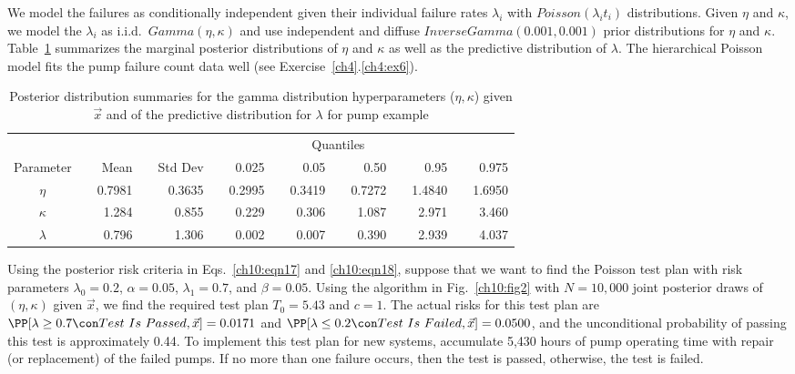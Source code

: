 \documentclass {book}
\begin{document}
\begin{sidebar}
We model the failures as conditionally independent given their
individual failure rates $\lambda_{i}$ with $Poisson(\lambda_i
t_i)$ distributions. Given $\eta$ and $\kappa$, we model the
$\lambda_i$ as i.i.d.\ $Gamma(\eta, \kappa)$ and use independent
and diffuse $InverseGamma(0.001,0.001)$ prior distributions for
$\eta$ and $\kappa$. Table~\ref{ch10:tab4} summarizes the marginal
posterior distributions of $\eta$ and $\kappa$ as well as the
predictive distribution of $\lambda$. The hierarchical Poisson
model fits the pump failure count data well (see
Exercise~\ref{ch4}.\ref{ch4:ex6}).

\begin{table}
\caption{Posterior distribution summaries for the
gamma distribution hyperparameters ($\eta, \kappa$) given
$\vec{x}$ and of the predictive distribution for $\lambda$ for pump example}\label{ch10:tab4}
 \centering
\begin{tabular}{crrrrrrrrrrrrrr}
\hline                              &       &    &       &       &
 &                                & & \multicolumn{3}{c}{Quantiles}  & &
 \\\cline{7-15}
  Parameter&\mbox{}&Mean&\mbox{}&Std
 Dev&\mbox{}\mbox{}\mbox{}
 &\multicolumn{1}{r}{0.025}&\mbox{}&\multicolumn{1}{r}{0.05}&\mbox{}&0.50 & \mbox{} & \multicolumn{1}{r}{0.95}& \mbox{} & \multicolumn{1}{r}{0.975}\\
\hline%
    $\eta$  &\mbox{} & 0.7981&\mbox{} & 0.3635&\mbox{} &        0.2995&\mbox{} &    0.3419&\mbox{} &    0.7272&\mbox{} &    1.4840&\mbox{} &    1.6950 \\
    $\kappa$&\mbox{} &  1.284&\mbox{} &     0.855&\mbox{} &         0.229&\mbox{} &     0.306&\mbox{} &      1.087&\mbox{} &    2.971&\mbox{} &     3.460 \\
    $\lambda$&\mbox{} &     0.796&\mbox{} &     1.306&\mbox{} &         0.002&\mbox{} &     0.007&\mbox{} &      0.390&\mbox{} &    2.939&\mbox{} &     4.037 \\
\hline
\end{tabular}
\end{table}

Using the posterior risk criteria in Eqs.~\ref{ch10:eqn17} and
\ref{ch10:eqn18}, suppose that we want to find the Poisson test
plan with risk parameters
$\lambda_{0} = 0.2$, $\alpha = 0.05$, $\lambda_{1} = 0.7$, and
$\beta = 0.05$. Using the algorithm in Fig.~\ref{ch10:fig2} with
$N = 10,000$ joint posterior draws of $(\eta, \kappa)$ given
$\vec{x}$, we find the required test plan $T_{0} = 5.43$ and $c =
1$. The actual risks for this test plan are $\PP[\lambda\geq 0.7
\con Test\mbox{ }Is\mbox{ }Passed, \vec{x} ] = 0.0171$ and $\PP[
\lambda\leq 0.2 \con Test\mbox{ }Is\mbox{ } Failed, \vec{x} ] =
0.0500$, and the unconditional probability of passing this test is
approximately 0.44. To implement this test plan for new systems,
accumulate 5,430 hours of pump operating time with repair (or
replacement) of the failed pumps. If no more than one failure
occurs, then the test is passed, otherwise, the test is failed.
\end{sidebar}
\end{document}
